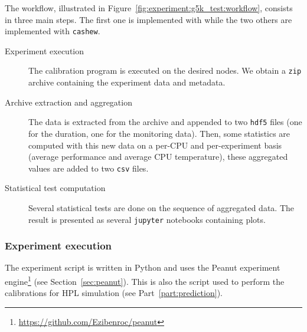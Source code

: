            The workflow, illustrated in Figure~\ref{fig:experiment:g5k_test:workflow}, consists in three main steps.
            The first one is implemented with \peanut while the two others are implemented with \texttt{cashew}.
            \begin{description}
                \item[Experiment execution] The \dgemm calibration program is executed on the desired nodes. We obtain
                    a \texttt{zip} archive containing the experiment data and metadata.
                \item[Archive extraction and aggregation] The data is extracted from the archive and appended to two
                    \texttt{hdf5} files (one for the \dgemm duration, one for the monitoring data). Then, some
                    statistics are computed with this new data on a per-CPU and per-experiment basis (\eg average \dgemm
                    performance and average CPU temperature), these aggregated values are added to two \texttt{csv}
                    files.
                \item[Statistical test computation] Several statistical tests are done on the sequence of aggregated
                    data. The result is presented as several \texttt{jupyter} notebooks containing plots.
            \end{description}


            \subsubsection{Experiment execution}%

                The experiment script is written in Python and uses the Peanut experiment
                engine\footnote{\url{https://github.com/Ezibenroc/peanut}} (see
                Section~\ref{sec:peanut}). This is also the script used to perform the \dgemm calibrations for HPL
                simulation (see Part~\ref{part:prediction}).

